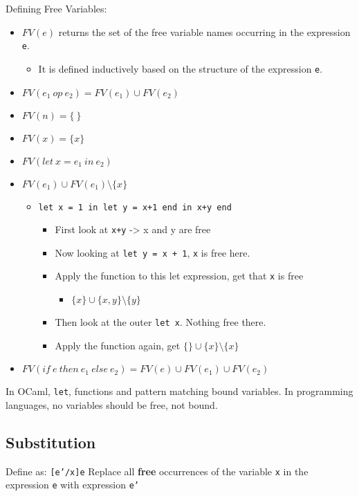 \documentclass[11pt]{article}
\begin{document}
Defining Free Variables:
\begin{itemize}
\item \(FV(e)\) returns the set of the free variable names occurring in the expression \texttt{e}.
\begin{itemize}
\item It is defined inductively based on the structure of the expression \texttt{e}.
\end{itemize}
\item \(FV(e_1 \ op \ e_2) = FV(e_1) \cup FV(e_2)\)
\item \(FV(n) = \{ \ \}\)
\item \(FV(x) = \{x\}\)
\item \(FV(let \ x = e_1 \ in \ e_2)\)
\item \(FV(e_1) \cup FV(e_1) \setminus \{x\}\)
\begin{itemize}
\item \texttt{let x = 1 in let y = x+1 end in x+y end}
\begin{itemize}
\item First look at \texttt{x+y} -> x and y are free
\item Now looking at \texttt{let y = x + 1}, \texttt{x} is free here.
\item Apply the function to this let expression, get that \texttt{x} is free
\begin{itemize}
\item \(\{x\} \cup \{x,y\}\setminus \{y\}\)
\end{itemize}
\item Then look at the outer \texttt{let x}. Nothing free there.
\item Apply the function again, get \(\{\} \cup \{x\} \setminus \{x\}\)
\end{itemize}
\end{itemize}
\item \(FV(if \ e \ then \ e_1 \ else \ e_2) = FV(e) \cup FV(e_1) \cup FV(e_2)\)
\end{itemize}
In OCaml, \texttt{let}, functions and pattern matching bound variables. In programming languages, no variables should be free, not bound.
\subsection{Substitution}
\label{sec:orgabf5b8e}
Define as: \texttt{[e'/x]e} Replace all \textbf{free} occurrences of the variable \texttt{x} in the expression \texttt{e} with expression \texttt{e'}
\end{document}
